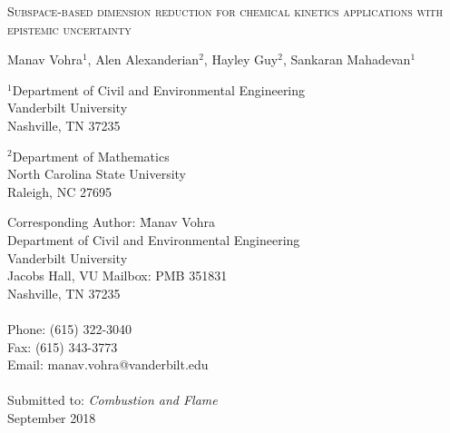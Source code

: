 \begin{center}
\textsc{Subspace-based dimension reduction for chemical kinetics applications with epistemic uncertainty}

\bigskip 
\bigskip 

Manav Vohra$^{1}$, Alen Alexanderian$^{2}$, Hayley Guy$^{2}$, Sankaran Mahadevan$^{1}$

\bigskip
\bigskip

\normalsize
$^1$Department of Civil and Environmental Engineering\\
Vanderbilt University\\
Nashville, TN 37235\\

\bigskip

$^2$Department of Mathematics\\
North Carolina State University\\
Raleigh, NC 27695\\

\bigskip

\end{center}

\vspace{6cm}

\begin{tabbing}
Corresponding Author: \hspace{5mm} \= Manav Vohra\\
       \>  Department of Civil and Environmental Engineering\\
       \>  Vanderbilt University\\
        Jacobs Hall, VU Mailbox: PMB 351831 \\
       \>  Nashville, TN 37235 \\
       \> \\
Phone: \> (615) 322-3040 \\
Fax:   \> (615) 343-3773 \\
Email: \>  manav.vohra@vanderbilt.edu   \\
\\
Submitted to: \> \textit{Combustion and Flame} \\
\>  September 2018\\

\bigskip
\end{tabbing}

\clearpage

